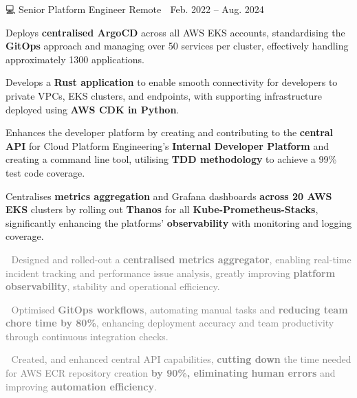 \documentclass{awesome-cv}
\newcommand{\hll}[1]{\noindent\colorbox{light-gray}{\parbox{17.5cm}{\textcolor{gray}{#1}}}}
\begin{document}
{\begin{cventries}
        {💻 Senior Platform Engineer} %
        {Remote 📍} %
        {Feb. 2022 – Aug. 2024 📆} %
        {\begin{cvitems}
                \item {Deploys \textbf{centralised ArgoCD} across all AWS EKS accounts, standardising the \textbf{GitOps} approach and managing over 50 services per cluster, effectively handling approximately 1300 applications.}
                \item {Develops a \textbf{Rust application} to enable smooth connectivity for developers to private VPCs, EKS clusters, and endpoints, with supporting infrastructure deployed using \textbf{AWS CDK in Python}.}
                \item {Enhances the developer platform by creating and contributing to the \textbf{central API} for Cloud Platform Engineering’s \textbf{Internal Developer Platform} and creating a command line tool, utilising \textbf{TDD methodology} to achieve a 99\% test code coverage.}
                \item{Centralises \textbf{metrics aggregation} and Grafana dashboards \textbf{across 20 AWS EKS} clusters by rolling out \textbf{Thanos} for all \textbf{Kube-Prometheus-Stacks}, significantly enhancing the platforms’ \textbf{observability} with monitoring and logging coverage.}
                \\
                \newline
                \hll{🎯 Designed and rolled-out a \textbf{centralised metrics aggregator}, enabling real-time incident tracking and performance issue analysis, greatly improving \textbf{platform observability}, stability and operational efficiency.}
                \hll{🎯 Optimised \textbf{GitOps workflows}, automating manual tasks and \textbf{reducing team chore time by 80\%}, enhancing deployment accuracy and team productivity through continuous integration checks.}
                \hll{🎯 Created, and enhanced central API capabilities, \textbf{cutting down} the time needed for AWS ECR repository creation \textbf{by 90\%, eliminating human errors} and improving \textbf{automation efficiency}.}
            \end{cvitems}
        }


\end{cventries}}
\end{document}

